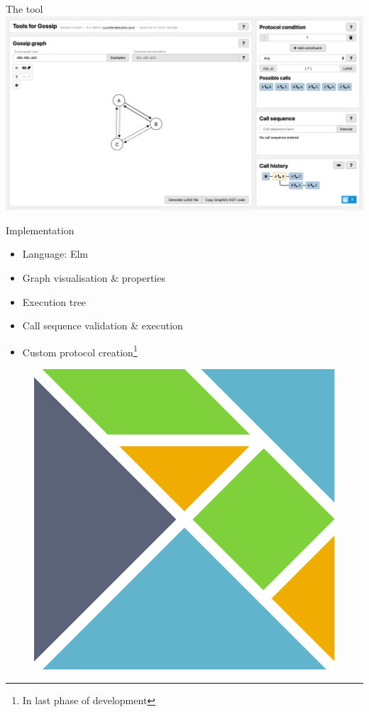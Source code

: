 \documentclass[aspectratio=169]{beamer}
\begin{document}
\begin{frame}[t]{The tool}
    \includegraphics[width=\linewidth]{tool.png}
\end{frame}
\begin{frame}[c]{Implementation}
    \begin{multicols}{2}
        \begin{itemize}
            \item<1-> Language: Elm \cite{czaplicki_asynchronous_2013}
            \item<2-> Graph visualisation \& properties
            \item<3-> Execution tree
            \item<4-> Call sequence validation \& execution
            \item<5-> Custom protocol creation\footnote{In last phase of development}
        \end{itemize}
        \columnbreak
        \begin{figure}
            \centering
            \includegraphics[width=.5\linewidth]{Elm_logo.pdf}
        \end{figure}
    \end{multicols}
\end{frame}
\end{document}
